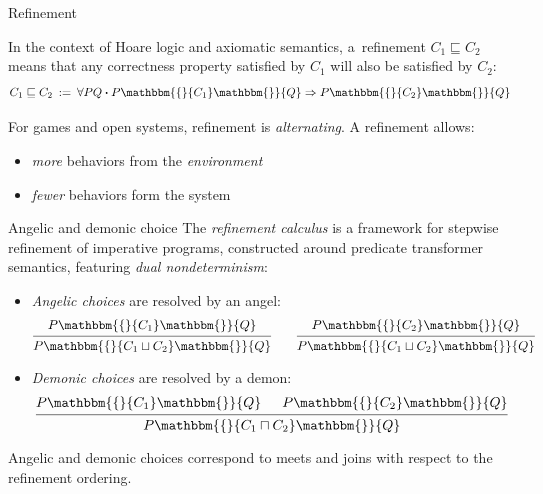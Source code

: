 \documentclass{beamer}
\newcommand{\bdot}{\boldsymbol{\cdot}}
\newcommand{\htr}[3]{{ {#1} \mathbbm{\{} {#2} \mathbbm{\}} {#3} }}
\begin{document}
\begin{frame}{Refinement} %

In the context of Hoare logic and axiomatic semantics,
a~refinement $C_1 \sqsubseteq C_2$
means that any correctness property satisfied by $C_1$
will also be satisfied by $C_2$:
\[
    C_1 \sqsubseteq C_2 \: := \:
    \forall P Q \bdot
      \htr{P}{C_1}{Q} \Rightarrow
      \htr{P}{C_2}{Q}
\]

For games and open systems,
refinement is \emph{alternating}.
A refinement allows:
\begin{itemize}
  \item \emph{more} behaviors from the \emph{environment}
  \item \emph{fewer} behaviors form the system
\end{itemize}
\end{frame}

\begin{frame}[fragile]{Angelic and demonic choice} %
The \emph{refinement calculus} 
is a framework for stepwise refinement
of imperative programs,
constructed around predicate transformer semantics,
featuring \emph{dual nondeterminism}:
\begin{itemize}
  \item \emph{Angelic choices} are resolved by an angel:
  \[
    \begin{prooftree}
      \hypo{\htr{P}{C_1}{Q}}
      \infer1{\htr{P}{C_1 \sqcup C_2}{Q}}
    \end{prooftree}
    \qquad
    \begin{prooftree}
      \hypo{\htr{P}{C_2}{Q}}
      \infer1{\htr{P}{C_1 \sqcup C_2}{Q}}
    \end{prooftree}
  \]
  \item \emph{Demonic choices} are resolved by a demon:
  \[
    \begin{prooftree}
      \hypo{\htr{P}{C_1}{Q}}
      \hypo{\htr{P}{C_2}{Q}}
      \infer2{\htr{P}{C_1 \sqcap C_2}{Q}}
    \end{prooftree}
  \]
\end{itemize}
Angelic and demonic choices correspond to meets and joins
with respect to the refinement ordering.
%
\end{frame}
\end{document}
